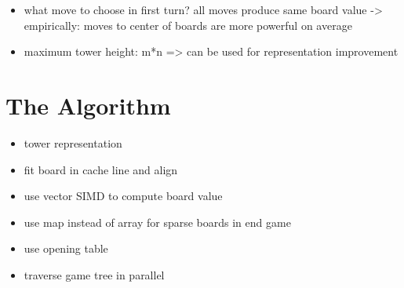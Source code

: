 \documentclass[sigconf]{acmart}
\newcommand{\bl}{\node [circle, minimum size=0.7cm, draw=black, fill=blue!65!white, thin]{};}
\newcommand{\wh}{\node [rectangle, minimum size=0.7cm, draw=black, fill=yellow] {};}
\begin{document}

\begin{itemize}
  \item what move to choose in first turn? all moves produce same board value -> empirically: moves to center of boards are more powerful on average \cite{Althöfer2020}
  \item maximum tower height: m*n => can be used for representation improvement
\end{itemize}

\section{The Algorithm}
\begin{itemize}
  \item tower representation
  \item fit board in cache line and align
  \item use vector SIMD to compute board value
  \item use map instead of array for sparse boards in end game
  \item use opening table
  \item traverse game tree in parallel
\end{itemize}
\end{document}
